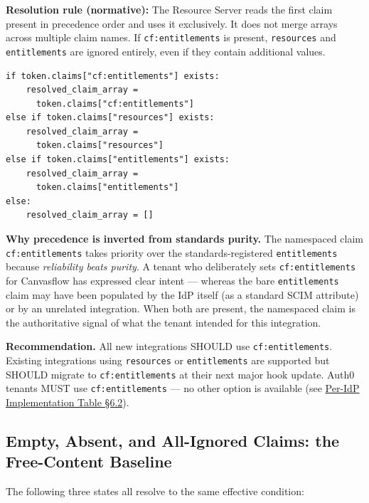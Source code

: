 \textbf{Resolution rule (normative):} The Resource Server reads the first claim present
in precedence order and uses it exclusively. It does not merge arrays across multiple
claim names. If \texttt{cf:entitlements} is present, \texttt{resources} and
\texttt{entitlements} are ignored entirely, even if they contain additional values.

\begin{lstlisting}
if token.claims["cf:entitlements"] exists:
    resolved_claim_array =
      token.claims["cf:entitlements"]
else if token.claims["resources"] exists:
    resolved_claim_array =
      token.claims["resources"]
else if token.claims["entitlements"] exists:
    resolved_claim_array =
      token.claims["entitlements"]
else:
    resolved_claim_array = []   
\end{lstlisting}

\textbf{Why precedence is inverted from standards purity.} The namespaced claim
\texttt{cf:entitlements} takes priority over the standards-registered
\texttt{entitlements} because \emph{reliability beats purity}. A tenant who deliberately
sets \texttt{cf:entitlements} for Canvasflow has expressed clear intent --- whereas the
bare \texttt{entitlements} claim may have been populated by the IdP itself (as a standard
SCIM attribute) or by an unrelated integration. When both are present, the namespaced
claim is the authoritative signal of what the tenant intended for this integration.

\textbf{Recommendation.} All new integrations SHOULD use \texttt{cf:entitlements}.
Existing integrations using \texttt{resources} or \texttt{entitlements} are supported
but SHOULD migrate to \texttt{cf:entitlements} at their next major hook update. Auth0
tenants MUST use \texttt{cf:entitlements} --- no other option is available (see
\hyperref[sec:per-idp-implementation]{Per-IdP Implementation Table \S6.2}).

\pagebreak

\subsection{Empty, Absent, and All-Ignored Claims: the Free-Content Baseline}\label{sec:free-content-baseline}

The following three states all resolve to the same effective condition:


